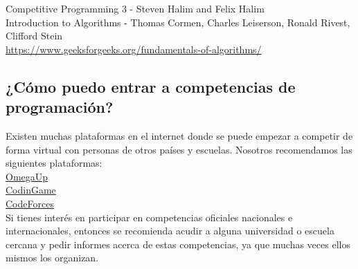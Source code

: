 \documentclass{article}
\begin{document}
Competitive Programming 3 - Steven Halim and Felix Halim \\

Introduction to Algorithms - Thomas Cormen, Charles Leiserson, Ronald Rivest, Clifford Stein \\

\url{https://www.geeksforgeeks.org/fundamentals-of-algorithms/} \\

\subsection{¿Cómo puedo entrar a competencias de programación?}

Existen muchas plataformas en el internet donde se puede empezar a competir de forma virtual con personas de otros países y escuelas. Nosotros recomendamos las siguientes plataformas: \\

\href{https://omegaup.com/}{OmegaUp} \\

\href{https://www.codingame.com/start}{CodinGame} \\

\href{https://codeforces.com/}{CodeForces} \\

Si tienes interés en participar en competencias oficiales nacionales e internacionales, entonces se recomienda acudir a alguna universidad o escuela cercana y pedir informes acerca de estas competencias, ya que muchas veces ellos mismos los organizan.
\end{document}

